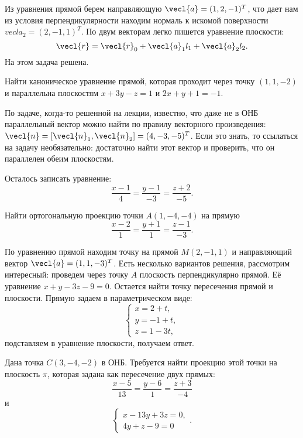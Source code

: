 Из уравнения прямой берем направляющую $\vecl{a} = (1,  2, -1)^T$, что дает нам из условия перпендикулярности находим нормаль к искомой поверхности $vecl{a}_2 = (2, -1, 1)^T$. По двум векторам легко пишется уравнение плоскости:
\begin{equation*}
    \vecl{r} = \vecl{r}_0 + \vecl{a}_1 l_1 + \vecl{a}_2 l_2.
\end{equation*}
На этом задача решена.

\begin{task}
    Найти каноническое уравнение прямой, которая проходит через точку $(1, 1, -2)$ и параллельна плоскостям $x + 3y - z = 1$ и $2x + y + 1 = -1$.
\end{task}

По задаче, когда-то решенной на лекции, известно, что даже не в ОНБ параллельный вектор можно найти по правилу векторного произведения: $\vecl{n} = [\vecl{n}_1, \vecl{n}_2] = (4, -3, -5)^T$. Если это знать, то ссылаться на задачу необязательно: достаточно найти этот вектор и проверить, что он параллелен обеим плоскостям.

Осталось записать уравнение:
\begin{equation*}
    \frac{x - 1}{4} = \frac{y - 1}{-3} = \frac{z + 2}{-5}.
\end{equation*}

\begin{task}
    Найти ортогональную проекцию точки $A(1, -4, -4)$ на прямую
    \begin{equation*}
        \frac{x - 2}{1} = \frac{y + 1}{1} = \frac{z - 1}{-3}.
    \end{equation*}
\end{task}

По уравнению прямой находим точку на прямой $M(2, -1, 1)$ и направляющий вектор $\vecl{a} = (1, 1, -3)^T$. Есть несколько вариантов решения, рассмотрим интересный: проведем через точку $A$ плоскость перпендикулярно прямой. Её уравнение $x + y - 3z - 9 = 0$. Остается найти точку пересечения прямой и плоскости. Прямую задаем в параметрическом виде:
\begin{equation*}
    \begin{cases}
        x = 2 + t, \\ y = -1 + t, \\ z = 1 - 3t,
    \end{cases}
\end{equation*}
подставляем в уравнение плоскости, получаем ответ.

\begin{task}
    Дана точка $C(3, -4, -2)$ в ОНБ. Требуется найти проекцию этой точки на плоскость $\pi$, которая задана как пересечение двух прямых:
    \begin{equation*}
        \frac{x - 5}{13} = \frac{y - 6}{1} = \frac{z + 3}{-4}
    \end{equation*}
    и
    \begin{equation*}
        \begin{cases}
            x - 13y + 3z = 0, \\
            4y + z - 9 = 0
        \end{cases}.
    \end{equation*}
\end{task}

